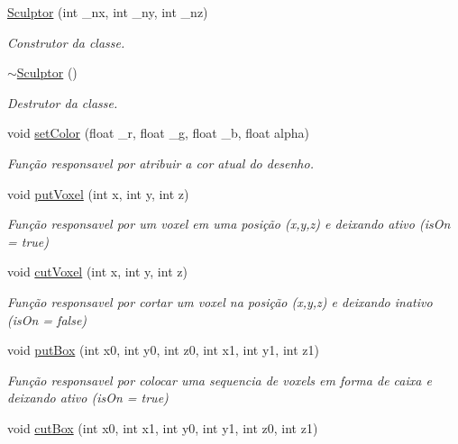 \begin{DoxyCompactItemize}
\item 
\hyperlink{class_sculptor_a014e3ef5517bf0e9d9e14486b6ac6433}{Sculptor} (int \+\_\+nx, int \+\_\+ny, int \+\_\+nz)
\begin{DoxyCompactList}\small\item\em Construtor da classe. \end{DoxyCompactList}\item 
\hyperlink{class_sculptor_a8f159bf97458326f16d2e238e11be7ff}{$\sim$\+Sculptor} ()
\begin{DoxyCompactList}\small\item\em Destrutor da classe. \end{DoxyCompactList}\item 
void \hyperlink{class_sculptor_a4e53f85ee03b729efafa985f72563c4b}{set\+Color} (float \+\_\+r, float \+\_\+g, float \+\_\+b, float alpha)
\begin{DoxyCompactList}\small\item\em Função responsavel por atribuir a cor atual do desenho. \end{DoxyCompactList}\item 
void \hyperlink{class_sculptor_a4bdea3048b419d58e93074060eaa7b52}{put\+Voxel} (int x, int y, int z)
\begin{DoxyCompactList}\small\item\em Função responsavel por um voxel em uma posição (x,y,z) e deixando ativo (is\+On = true) \end{DoxyCompactList}\item 
void \hyperlink{class_sculptor_ad9d714a35fc8ae16d06eb5df37c3493c}{cut\+Voxel} (int x, int y, int z)
\begin{DoxyCompactList}\small\item\em Função responsavel por cortar um voxel na posição (x,y,z) e deixando inativo (is\+On = false) \end{DoxyCompactList}\item 
void \hyperlink{class_sculptor_a88b0c956505a1b788829cf98277b4af0}{put\+Box} (int x0, int y0, int z0, int x1, int y1, int z1)
\begin{DoxyCompactList}\small\item\em Função responsavel por colocar uma sequencia de voxels em forma de caixa e deixando ativo (is\+On = true) \end{DoxyCompactList}\item 
void \hyperlink{class_sculptor_aa84a1b12b09e9e103fc8d78f8d1bc00f}{cut\+Box} (int x0, int x1, int y0, int y1, int z0, int z1)

\end{DoxyCompactItemize}
